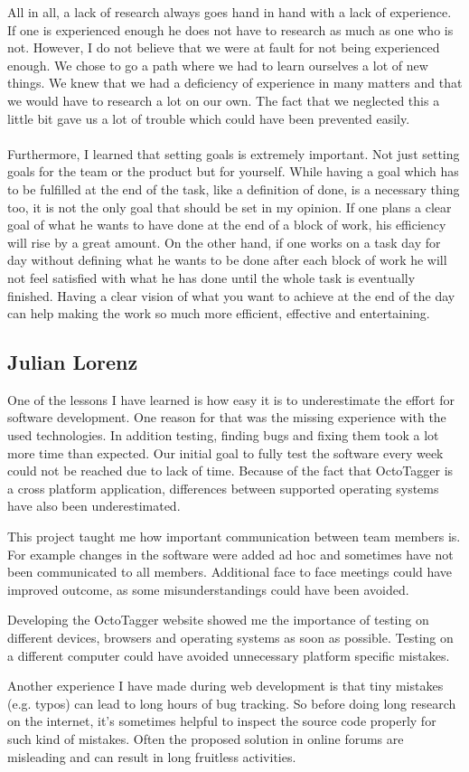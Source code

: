 All in all, a lack of research always goes hand in hand with a lack of experience. If one is experienced enough he does not have to research as much as one who is not. However, I do not believe that we were at fault for not being experienced enough. We chose to go a path where we had to learn ourselves a lot of new things. We knew that we had a deficiency of experience in many matters and that we would have to research a lot on our own. The fact that we neglected this a little bit gave us a lot of trouble which could have been prevented easily.

\paragraph{}
Furthermore, I learned that setting goals is extremely important. Not just setting goals for the team or the product but for yourself. While having a goal which has to be fulfilled at the end of the task, like a definition of done, is a necessary thing too, it is not the only goal that should be set in my opinion. If one plans a clear goal of what he wants to have done at the end of a block of work, his efficiency will rise by a great amount. On the other hand, if one works on a task day for day without defining what he wants to be done after each block of work he will not feel satisfied with what he has done until the whole task is eventually finished. Having a clear vision of what you want to achieve at the end of the day can help making the work so much more efficient, effective and entertaining.

\subsection{Julian Lorenz}

One of the lessons I have learned is how easy it is to underestimate the effort for software development. One reason for that was the missing experience with the used technologies. In addition testing, finding bugs and fixing them took a lot more time than expected. Our initial goal to fully test the software every week could not be reached due to lack of time. Because of the fact that OctoTagger is a cross platform application, differences between supported operating systems have also been underestimated.

This project taught me how important communication between team members is. For example changes in the software were added ad hoc and sometimes have not been communicated to all members. Additional face to face meetings could have improved outcome, as some misunderstandings could have been avoided.

Developing the OctoTagger website showed me the importance of testing on different devices, browsers and operating systems as soon as possible. Testing on a different computer could have avoided unnecessary platform specific mistakes.

Another experience I have made during web development is that tiny mistakes (e.g. typos) can lead to long hours of bug tracking. So before doing long research on the internet, it's sometimes helpful to inspect the source code properly for such kind of mistakes. Often the proposed solution in online forums are misleading and can result in long fruitless activities.
